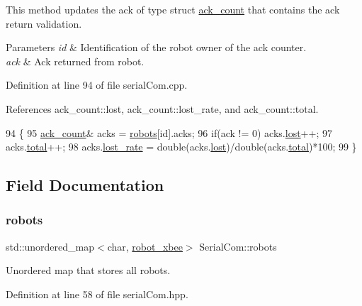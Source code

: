 This method updates the ack of type struct \hyperlink{structack__count}{ack\+\_\+count} that contains the ack return validation. 


\begin{DoxyParams}{Parameters}
{\em id} & Identification of the robot owner of the ack counter. \\
\hline
{\em ack} & Ack returned from robot. \\
\hline
\end{DoxyParams}


Definition at line 94 of file serial\+Com.\+cpp.



References ack\+\_\+count\+::lost, ack\+\_\+count\+::lost\+\_\+rate, and ack\+\_\+count\+::total.


\begin{DoxyCode}
94                                            \{
95     \hyperlink{structack__count}{ack\_count}& acks = \hyperlink{class_serial_com_ae20f6fe8f53cb581b285924eda5ad01c}{robots}[id].acks;
96     \textcolor{keywordflow}{if}(ack != 0) acks.\hyperlink{structack__count_a621179b83751cda8db5f662d8bf0f591}{lost}++;
97     acks.\hyperlink{structack__count_acad0aaa27c2d3742cd2d1dec03374cc0}{total}++;
98     acks.\hyperlink{structack__count_a5727e1fe59488611b16b22b82af97e52}{lost\_rate} = double(acks.\hyperlink{structack__count_a621179b83751cda8db5f662d8bf0f591}{lost})/double(acks.\hyperlink{structack__count_acad0aaa27c2d3742cd2d1dec03374cc0}{total})*100;
99 \}
\end{DoxyCode}


\subsection{Field Documentation}
\mbox{\label{class_serial_com_ae20f6fe8f53cb581b285924eda5ad01c}} 
\subsubsection{\texorpdfstring{robots}{robots}}
{\footnotesize\ttfamily std\+::unordered\+\_\+map$<$char, \hyperlink{structrobot__xbee}{robot\+\_\+xbee}$>$ Serial\+Com\+::robots\hspace{0.3cm}{\ttfamily [private]}}

Unordered map that stores all robots. 

Definition at line 58 of file serial\+Com.\+hpp.


